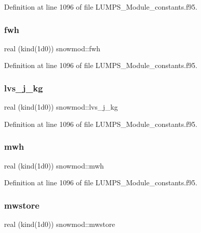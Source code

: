 Definition at line 1096 of file L\+U\+M\+P\+S\+\_\+\+Module\+\_\+constants.\+f95.

\mbox{\label{namespacesnowmod_a67018a3202a62ad0d4e7715dbfcf5e50}} 
\subsubsection{\texorpdfstring{fwh}{fwh}}
{\footnotesize\ttfamily real (kind(1d0)) snowmod\+::fwh}



Definition at line 1096 of file L\+U\+M\+P\+S\+\_\+\+Module\+\_\+constants.\+f95.

\mbox{\label{namespacesnowmod_aa988f82274f056c6d2f7ed3d37457b24}} 
\subsubsection{\texorpdfstring{lvs\+\_\+j\+\_\+kg}{lvs\_j\_kg}}
{\footnotesize\ttfamily real (kind(1d0)) snowmod\+::lvs\+\_\+j\+\_\+kg}



Definition at line 1096 of file L\+U\+M\+P\+S\+\_\+\+Module\+\_\+constants.\+f95.

\mbox{\label{namespacesnowmod_a7e8123e5b32bedfb676ea5c6ca62272a}} 
\subsubsection{\texorpdfstring{mwh}{mwh}}
{\footnotesize\ttfamily real (kind(1d0)) snowmod\+::mwh}



Definition at line 1096 of file L\+U\+M\+P\+S\+\_\+\+Module\+\_\+constants.\+f95.

\mbox{\label{namespacesnowmod_affe56e4e5f1d5df5d7f4bbae7ae22541}} 
\subsubsection{\texorpdfstring{mwstore}{mwstore}}
{\footnotesize\ttfamily real (kind(1d0)) snowmod\+::mwstore}



